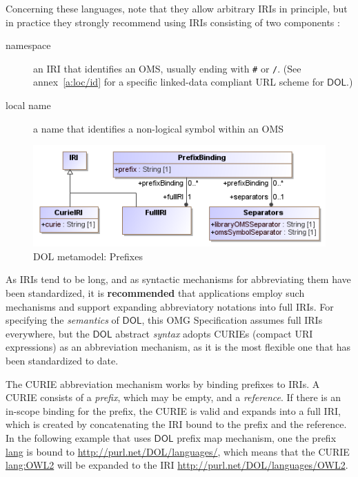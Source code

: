 \documentclass[10pt, a4paper]{isov2}
\newcommand*{\syntax}[1]{\texttt{#1}}
\newcommand*{\recommended}{\textbf{recommended}\xspace}
\newcommand*{\IS}{OMG Specification\xspace}
\newcommand*{\DOL}{\ensuremath{\mathsf{DOL}}\xspace}
\begin{document}
Concerning these languages, note that they allow arbitrary IRIs in principle, but in practice they 
strongly recommend using IRIs consisting of two components \cite{W3C:NOTE-swbp-vocab-pub-20080828}:
\begin{description}
\item[namespace] an IRI that identifies an OMS,
usually ending with \syntax{\#} or \syntax{/}. ({See annex~\ref{a:loc/id} for a specific linked-data compliant URL scheme for \DOL.})
\item[local name] a name that identifies a non-logical symbol within an OMS
\end{description}

\medskip
\begin{figure}
  \centering
    \includegraphics[scale=0.47]{mof/prefixes.png}
  \caption{DOL metamodel: Prefixes}
  \label{fig:prefixes}
\end{figure}


\label{c:curies}

As IRIs tend to be long, and as syntactic mechanisms for abbreviating them have been standardized, 
it is \recommended that applications employ such mechanisms and support expanding abbreviatory
notations into full IRIs.  For specifying the \emph{semantics} of \DOL, this \IS assumes full IRIs 
everywhere, but the \DOL abstract \emph{syntax} adopts CURIEs (compact URI expressions) as an 
abbreviation mechanism, as it is the most flexible one that has been standardized to date.  

The CURIE abbreviation mechanism works by binding prefixes to IRIs.  A CURIE consists of a 
\emph{prefix}, which may be empty, and a \emph{reference}.  If there is an in-scope binding for the 
prefix, the CURIE is valid and expands into a full IRI, which is created by concatenating the IRI 
bound to the prefix and the reference.  In the following example that uses \DOL prefix map mechanism, one the prefix \url{lang} is bound to \url{http://purl.net/DOL/languages/}, which
means that the CURIE \url{lang:OWL2} will be expanded to the IRI
\url{http://purl.net/DOL/languages/OWL2}.
\end{document}
